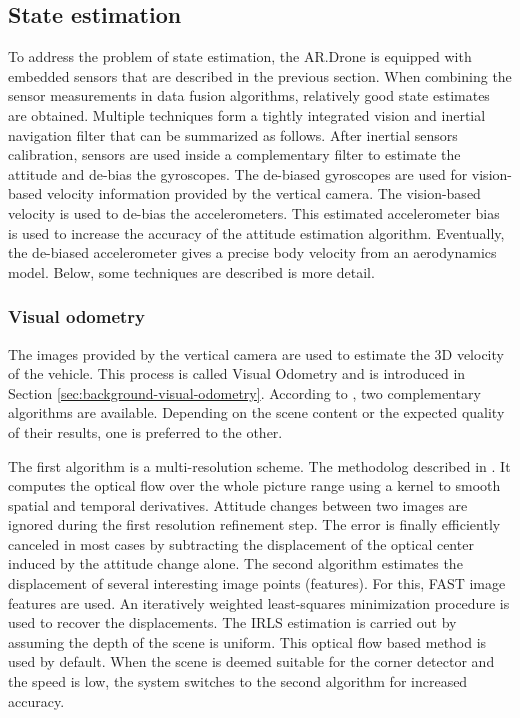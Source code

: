 \subsection{State estimation}
To address the problem of state estimation, the AR.Drone is equipped with embedded sensors that are described in the previous section.
When combining the sensor measurements in data fusion algorithms, relatively good state estimates are obtained.
Multiple techniques form a tightly integrated vision and inertial navigation filter that can be summarized as follows.
After inertial sensors calibration, sensors are used inside a complementary filter to estimate the attitude and de-bias the gyroscopes.
The de-biased gyroscopes are used for vision-based velocity information provided by the vertical camera.
The vision-based velocity is used to de-bias the accelerometers. This estimated accelerometer bias is used to increase the accuracy of the attitude estimation algorithm.
Eventually, the de-biased accelerometer gives a precise body velocity from an aerodynamics model.
Below, some techniques are described is more detail.

\subsubsection{Visual odometry}
\label{sec:platform-visual-odometry}
The images provided by the vertical camera are used to estimate the 3D velocity of the vehicle.
This process is called Visual Odometry and is introduced in Section \ref{sec:background-visual-odometry}.
According to \cite{bristeau2011navigation}, two complementary algorithms are available.
Depending on the scene content or the expected quality of their results, one is preferred to the other.

The first algorithm is a multi-resolution scheme.
The methodolog described in \cite{lukas1981iterative}.
It computes the optical flow over the whole picture range using a kernel to smooth spatial and temporal derivatives.
Attitude changes between two images are ignored during the first resolution refinement step.
The error is finally efficiently canceled in most cases by subtracting the displacement of the optical center induced by the attitude change alone.
The second algorithm estimates the displacement of several interesting image points (features).
For this, FAST image features are used.
An iteratively weighted least-squares minimization procedure is used to recover the displacements.
The IRLS estimation \cite{michaelsen2004pose} is carried out by assuming the depth of the scene is uniform.
This optical flow based method is used by default.
When the scene is deemed suitable for the corner detector and the speed is low, the system switches to the second algorithm for increased accuracy.


